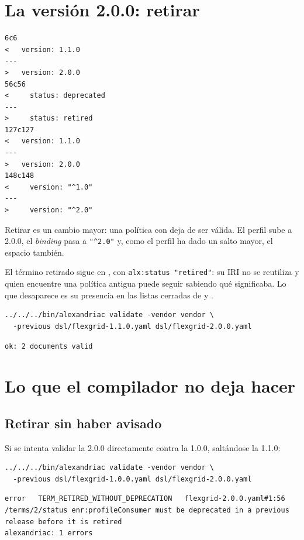 \section{La versión 2.0.0: retirar}

\begin{lstlisting}[style=out]
6c6
<   version: 1.1.0
---
>   version: 2.0.0
56c56
<     status: deprecated
---
>     status: retired
127c127
<   version: 1.1.0
---
>   version: 2.0.0
148c148
<     version: "^1.0"
---
>     version: "^2.0"
\end{lstlisting}

Retirar es un cambio mayor: una política con  deja de ser válida. El perfil sube a 2.0.0,
el \emph{binding} pasa a \texttt{"\textasciicircum{}2.0"} y, como el perfil ha dado un salto mayor, el espacio también.

El término retirado sigue en , con \texttt{alx:status "retired"}: su IRI no se reutiliza y quien
encuentre una política antigua puede seguir sabiendo qué significaba. Lo que desaparece es su presencia en las
listas cerradas de  y .

\begin{lstlisting}[style=sh]
../../../bin/alexandriac validate -vendor vendor \
  -previous dsl/flexgrid-1.1.0.yaml dsl/flexgrid-2.0.0.yaml
\end{lstlisting}
\begin{lstlisting}[style=out]
ok: 2 documents valid
\end{lstlisting}

\section{Lo que el compilador no deja hacer}

\subsection{Retirar sin haber avisado}

Si se intenta validar la 2.0.0 directamente contra la 1.0.0, saltándose la 1.1.0:

\begin{lstlisting}[style=sh]
../../../bin/alexandriac validate -vendor vendor \
  -previous dsl/flexgrid-1.0.0.yaml dsl/flexgrid-2.0.0.yaml
\end{lstlisting}
\begin{lstlisting}[style=out]
error   TERM_RETIRED_WITHOUT_DEPRECATION   flexgrid-2.0.0.yaml#1:56 /terms/2/status enr:profileConsumer must be deprecated in a previous release before it is retired
alexandriac: 1 errors
\end{lstlisting}

